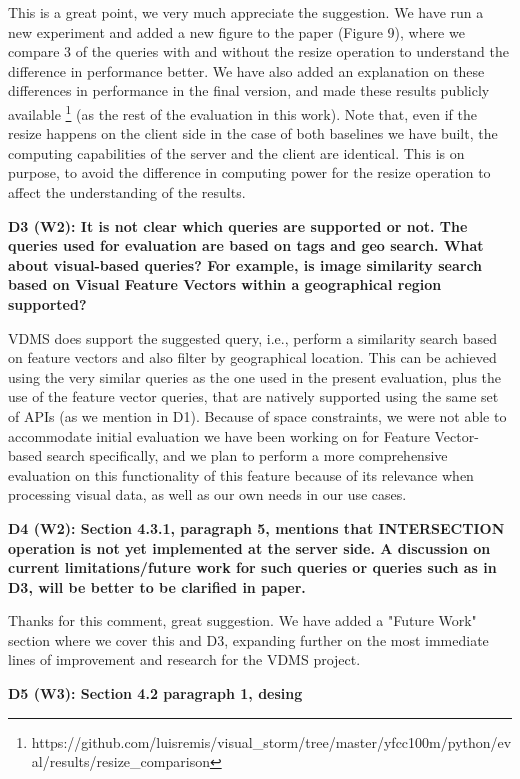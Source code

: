\documentclass[11pt]{proposalnsf}
\begin{document}
This is a great point, we very much appreciate the suggestion.
We have run a new experiment and added a new figure to the paper (Figure 9),
where we compare 3 of the queries with and without the resize operation
to understand the difference in performance better.
We have also added an explanation on these differences in performance
in the final version, and made these results publicly available
\footnote{https://github.com/luisremis/visual\_storm/tree/master/yfcc100m/python/eval/results/resize\_comparison}
(as the rest of the evaluation in this work).
Note that, even if the resize happens on the client side in the case of both
baselines we have built, the computing capabilities of the server and the
client are identical.
This is on purpose, to avoid the difference in computing power for the
resize operation to affect the understanding of the results.

\bigskip
\noindent %
\textbf{
D3 (W2): It is not clear which queries are supported or not.
The queries used for evaluation are based on tags and geo search.
What about visual-based queries? For example, is image similarity search based
on Visual Feature Vectors within a geographical region supported?
}\bigskip

VDMS does support the suggested query, i.e., perform a similarity search based
on feature vectors and also filter by geographical location.
This can be achieved using the very similar queries as the one used in
the present evaluation, plus the use of the feature vector queries,
that are natively supported using the same set of APIs (as we mention in D1).
Because of space constraints, we were not able to accommodate initial evaluation
we have been working on for Feature Vector-based search specifically,
and we plan to perform a more comprehensive evaluation on this functionality
of this feature because of its relevance when processing visual data, as well
as our own needs in our use cases.

\bigskip
\noindent %
\textbf{
D4 (W2): Section 4.3.1, paragraph 5, mentions that INTERSECTION operation is not
yet implemented at the server side.
A discussion on current limitations/future work for such queries or queries
such as in D3, will be better to be clarified in paper.
}\bigskip

Thanks for this comment, great suggestion.
We have added a "Future Work" section where we cover this and D3,
expanding further on the most immediate lines of improvement and
research for the VDMS project.

\bigskip
\noindent %
\textbf{
D5 (W3): Section 4.2 paragraph 1, desing
}\bigskip
\end{document}
